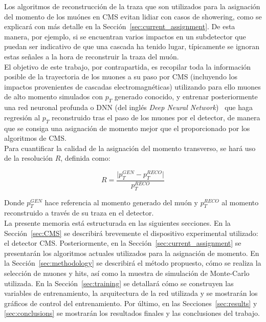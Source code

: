 Los algoritmos de reconstrucci\'on de la traza que son utilizados para la asignaci\'on del momento de los mu\'ones en CMS evitan lidiar con casos de showering, como se explicar\'a con m\'as detalle en la Secci\'on~\ref{sec:current_assignment}. De esta manera, por ejemplo, si se encuentran varios impactos en un subdetector que puedan ser indicativo de que una cascada ha tenido lugar, t\'ipicamente se ignoran estas se\~nales a la hora de reconstruir la traza del mu\'on. \\
El objetivo de este trabajo, por contrapartida, es recopilar toda la informaci\'on posible de la trayectoria de los muones a su paso por CMS (incluyendo los impactos provenientes de cascadas electromagn\'eticas) utilizando para ello muones de alto momento simulados con $p_{T}$ generado conocido, y entrenar posteriormente una red neuronal profunda o DNN (del ingl\'es \textit{Deep Neural Network})~\cite{Schmidhuber:2015} que haga regresi\'on al $p_{T}$ reconstruido tras el paso de los muones por el detector, de manera que se consiga una asignaci\'on de momento mejor que el proporcionado por los algoritmos de CMS. \\

Para cuantificar la calidad de la asignaci\'on del momento transverso, se har\'a uso de la resoluci\'on $R$, definida como:

\begin{equation}
  R = \dfrac{\lvert p_{T}^{GEN} - p_{T}^{RECO}\rvert}{p_{T}^{RECO}}
\label{eq:R}
\end{equation}

Donde $p_{T}^{GEN}$ hace referencia al momento generado del mu\'on y $p_{T}^{RECO}$ al momento reconstruido a trav\'es de su traza en el detector. \\

La presente memoria est\'a estructurada en las siguientes secciones. En la Secci\'on~\ref{sec:CMS} se describir\'a brevemente el dispositivo experimental utilizado: el detector CMS. Posteriormente, en la Secci\'on~\ref{sec:current_assignment} se presentar\'an los algoritmos actuales utilizados para la asignaci\'on de momento. En la Secci\'on~\ref{sec:methodology} se describir\'a el m\'etodo propuesto, c\'omo se realiza la selecci\'on de muones y hits, as\'i como la muestra de simulaci\'on de Monte-Carlo utilizada. En la Secci\'on~\ref{sec:training} se detallar\'a c\'omo se construyen las variables de entrenamiento, la arquitectura de la red utilizada y se mostrar\'an los gr\'aficos de control del entrenamiento. Por \'ultimo, en las Secciones~\ref{sec:results} y \ref{sec:conclusions} se mostrar\'an los resultados finales y las conclusiones del trabajo.
